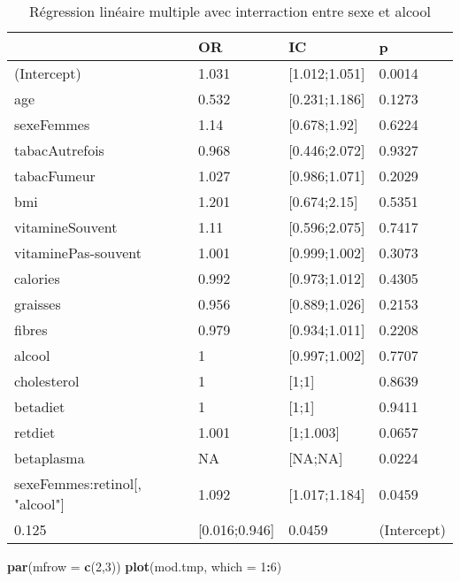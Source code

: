 \documentclass[]{article}
\newenvironment{Shaded}{\begin{snugshade}}{\end{snugshade}}
\newcommand{\KeywordTok}[1]{\textcolor[rgb]{0.13,0.29,0.53}{\textbf{#1}}}
\newcommand{\DataTypeTok}[1]{\textcolor[rgb]{0.13,0.29,0.53}{#1}}
\newcommand{\DecValTok}[1]{\textcolor[rgb]{0.00,0.00,0.81}{#1}}
\newcommand{\OperatorTok}[1]{\textcolor[rgb]{0.81,0.36,0.00}{\textbf{#1}}}
\newcommand{\NormalTok}[1]{#1}
\begin{document}
\begin{table}

\caption{\label{tab:unnamed-chunk-84}Régression linéaire multiple avec interraction entre sexe et alcool}
\centering
\begin{tabular}[t]{l|l|l|l}
\hline
  & OR & IC & p\\
\hline
\rowcolor[HTML]{BBD2E1}  (Intercept) & 1.031 & [1.012;1.051] & 0.0014\\
\hline
age & 0.532 & [0.231;1.186] & 0.1273\\
\hline
\rowcolor[HTML]{BBD2E1}  sexeFemmes & 1.14 & [0.678;1.92] & 0.6224\\
\hline
tabacAutrefois & 0.968 & [0.446;2.072] & 0.9327\\
\hline
\rowcolor[HTML]{BBD2E1}  tabacFumeur & 1.027 & [0.986;1.071] & 0.2029\\
\hline
bmi & 1.201 & [0.674;2.15] & 0.5351\\
\hline
\rowcolor[HTML]{BBD2E1}  vitamineSouvent & 1.11 & [0.596;2.075] & 0.7417\\
\hline
vitaminePas-souvent & 1.001 & [0.999;1.002] & 0.3073\\
\hline
\rowcolor[HTML]{BBD2E1}  calories & 0.992 & [0.973;1.012] & 0.4305\\
\hline
graisses & 0.956 & [0.889;1.026] & 0.2153\\
\hline
\rowcolor[HTML]{BBD2E1}  fibres & 0.979 & [0.934;1.011] & 0.2208\\
\hline
alcool & 1 & [0.997;1.002] & 0.7707\\
\hline
\rowcolor[HTML]{BBD2E1}  cholesterol & 1 & [1;1] & 0.8639\\
\hline
betadiet & 1 & [1;1] & 0.9411\\
\hline
\rowcolor[HTML]{BBD2E1}  retdiet & 1.001 & [1;1.003] & 0.0657\\
\hline
betaplasma & NA & [NA;NA] & 0.0224\\
\hline
\rowcolor[HTML]{BBD2E1}  sexeFemmes:retinol[, "alcool"] & 1.092 & [1.017;1.184] & 0.0459\\
\hline
0.125 & [0.016;0.946] & 0.0459 & (Intercept)\\
\hline
\end{tabular}
\end{table}

\begin{Shaded}
\begin{Highlighting}[]
\KeywordTok{par}\NormalTok{(}\DataTypeTok{mfrow =} \KeywordTok{c}\NormalTok{(}\DecValTok{2}\NormalTok{,}\DecValTok{3}\NormalTok{))}
\KeywordTok{plot}\NormalTok{(mod.tmp, }\DataTypeTok{which =} \DecValTok{1}\OperatorTok{:}\DecValTok{6}\NormalTok{)}
\end{Highlighting}
\end{Shaded}
\end{document}
